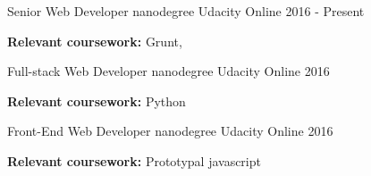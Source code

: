 


\begin{cventries}


\cventry
{Senior Web Developer nanodegree} %
{Udacity} %
{Online} %
{2016 - Present} %
{ %
	\begin{cvitems}
		\textbf{Relevant coursework:} Grunt,
	\end{cvitems}
}


\cventry
{Full-stack Web Developer nanodegree} %
{Udacity} %
{Online} %
{2016} %
{ %
	\begin{cvitems}
		\textbf{Relevant coursework:} Python
	\end{cvitems}
}


\cventry
{Front-End Web Developer nanodegree} %
{Udacity} %
{Online} %
{2016} %
{ %
\begin{cvitems}
	\textbf{Relevant coursework:} Prototypal javascript
\end{cvitems}
}


\end{cventries}